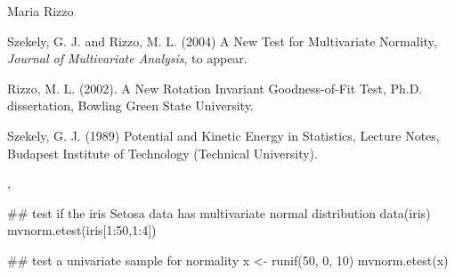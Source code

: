 \documentclass{article}
\begin{document}
\begin{Author}\relax
Maria Rizzo 
\end{Author}
\begin{References}\relax
Szekely, G. J. and Rizzo, M. L. (2004) A New Test for 
Multivariate Normality, \emph{Journal of Multivariate Analysis},
to appear.

Rizzo, M. L. (2002). A New Rotation Invariant Goodness-of-Fit Test,
Ph.D. dissertation, Bowling Green State University.

Szekely, G. J. (1989) Potential and Kinetic Energy in Statistics, 
Lecture Notes, Budapest Institute of Technology (Technical University).\end{References}
\begin{SeeAlso}\relax
{},
\end{SeeAlso}
\begin{Examples}
\begin{ExampleCode}
 ## test if the iris Setosa data has multivariate normal distribution
 data(iris)
 mvnorm.etest(iris[1:50,1:4])
 
 ## test a univariate sample for normality
 x <- runif(50, 0, 10)
 mvnorm.etest(x)
 \end{ExampleCode}
\end{Examples}
\end{document}
